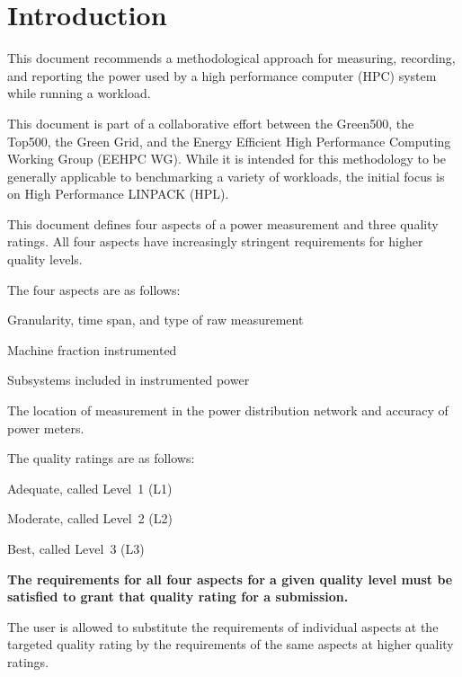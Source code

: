 \chapter{Introduction}
\label{sec:intro}

\noindent
This document recommends a methodological approach for measuring, recording, and reporting the power used by a high performance 
computer (HPC) system while
running a workload. 
\wl

\noindent
This document is part of a collaborative effort between the Green500, the Top500, 
the Green Grid, and the Energy Efficient High Performance Computing Working Group (EEHPC WG).  While 
it is intended for this methodology to be generally applicable to benchmarking a variety of 
workloads, the initial focus is on High Performance LINPACK (HPL). 
\wl

\noindent
This document defines four aspects of a power measurement and three quality ratings. All 
four aspects have increasingly stringent requirements for higher quality levels.  
\wl

\noindent
The four aspects are as follows:

\begin{packed_enum}
\item 
Granularity, time span, and type of raw measurement
\item 
Machine fraction instrumented
\item 
Subsystems included in instrumented power
\item 
The location of measurement in the power distribution network and accuracy of power meters.
\end{packed_enum}

\noindent
The quality ratings are as follows:

\begin{packed_item}
\item 
Adequate, called Level~1 (L1)
\item
Moderate, called Level~2 (L2)
\item
Best, called Level~3 (L3)
\end{packed_item}

\noindent
\textbf{The requirements for all four aspects for a given quality level must be satisfied to grant that quality rating for a submission.}
\wl

\noindent
The user is allowed to substitute the requirements of individual aspects at the targeted quality rating by the requirements of the same aspects at higher quality ratings.
\wl
